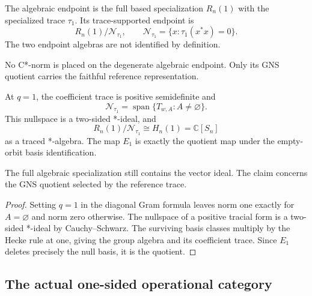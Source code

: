 \begin{definition}
The algebraic endpoint is the full based specialization $R_n(1)$ with the
specialized trace $\tau_1$.  Its trace-supported endpoint is
\[
 R_n(1)/\mathcal N_{\tau_1},\qquad
 \mathcal N_{\tau_1}=\{x:\tau_1(x^*x)=0\}.
\]
The two endpoint algebras are not identified by definition.
\end{definition}
\begin{scope}
No C*-norm is placed on the degenerate algebraic endpoint.  Only its GNS
quotient carries the faithful reference representation.
\end{scope}

\begin{theorem}
{\normalfont\statusProved}\quad
At $q=1$, the coefficient trace is positive semidefinite and
\[
 \mathcal N_{\tau_1}=\operatorname{span}
       \{T_{w,A}:A\neq\varnothing\}.
\]
This nullspace is a two-sided *-ideal, and
\[
 R_n(1)/\mathcal N_{\tau_1}\cong H_n(1)=\mathbb C[S_n]
\]
as a traced *-algebra.  The map $E_1$ is exactly the quotient map under the
empty-orbit basis identification.
\end{theorem}
\begin{scope}
The full algebraic specialization still contains the vector ideal.  The
claim concerns the GNS quotient selected by the reference trace.
\end{scope}
\begin{proof}
Setting $q=1$ in the diagonal Gram formula leaves norm one exactly for
$A=\varnothing$ and norm zero otherwise.  The nullspace of a positive
tracial form is a two-sided *-ideal by Cauchy--Schwarz.  The surviving basis
classes multiply by the Hecke rule at one, giving the group algebra and its
coefficient trace.  Since $E_1$ deletes precisely the null basis, it is the
quotient.
\end{proof}

\subsection{The actual one-sided operational category}

